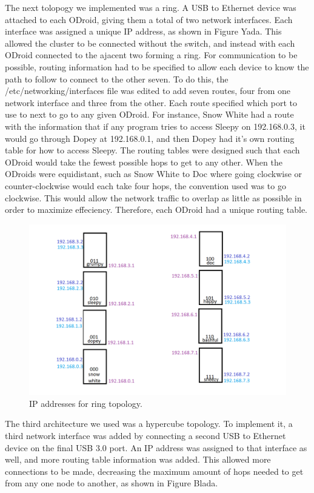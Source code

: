 	The next tolopogy we implemented was a ring. A USB to Ethernet device was attached to each ODroid, giving them a total of two network interfaces. Each interface was assigned a unique IP address, as shown in Figure Yada. This allowed the cluster to be connected without the switch, and instead with each ODroid connected to the ajacent two forming a ring. For communication to be possible, routing information had to be specified to allow each device to know the path to follow to connect to the other seven. To do this, the /etc/networking/interfaces file was edited to add seven routes, four from one network interface and three from the other. Each route specified which port to use to next to go to any given ODroid. For instance, Snow White had a route with the information that if any program tries to access Sleepy on 192.168.0.3, it would go through Dopey at 192.168.0.1, and then Dopey had it's own routing table for how to access Sleepy.
	The routing tables were designed such that each ODroid would take the fewest possible hops to get to any other. When the ODroids were equidistant, such as Snow White to Doc where going clockwise or counter-clockwise would each take four hops, the convention used was to go clockwise. This would allow the network traffic to overlap as little as possible in order to maximize effeciency. Therefore, each ODroid had a unique routing table. 

\begin{figure}[h]
	\caption{IP addresses for ring topology.}
	\centering
		\includegraphics[scale=0.5]{cluster_ipaddresses.png}
\end{figure}

	The third architecture we used was a hypercube topology. To implement it, a third network interface was added by connecting a second USB to Ethernet device on the final USB 3.0 port. An IP address was assigned to that interface as well, and more routing table information was added. This allowed more connections to be made, decreasing the maximum amount of hops needed to get from any one node to another, as shown in Figure Blada. 

